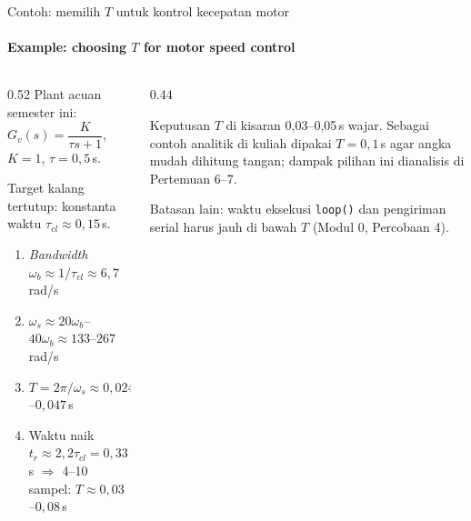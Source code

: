 \documentclass[aspectratio=169,10pt]{beamer}
\begin{document}
\begin{frame}{Contoh: memilih $T$ untuk kontrol kecepatan motor}
	\framesubtitle{Example: choosing $T$ for motor speed control}
	\begin{columns}[T]
		\begin{column}{0.52\textwidth}
			\small
			Plant acuan semester ini: $G_v(s) = \dfrac{K}{\tau s+1}$, $K=1$, $\tau = 0{,}5$\,s.

			\vspace{0.2cm}
			Target kalang tertutup: konstanta waktu $\tau_{cl} \approx 0{,}15$\,s.
			\begin{enumerate}
				\item \textit{Bandwidth} $\omega_b \approx 1/\tau_{cl} \approx 6{,}7$ rad/s
				\item $\omega_s \approx 20\omega_b$--$40\omega_b \approx 133$--$267$ rad/s
				\item $T = 2\pi/\omega_s \approx 0{,}024$--$0{,}047$\,s
				\item Waktu naik $t_r \approx 2{,}2\tau_{cl} = 0{,}33$\,s $\Rightarrow$ 4--10 sampel: $T \approx 0{,}03$--$0{,}08$\,s
			\end{enumerate}
		\end{column}
		\begin{column}{0.44\textwidth}
			\begin{block}{Keputusan}
				\small
				$T$ di kisaran 0,03--0,05\,s wajar. Sebagai contoh analitik di kuliah dipakai $T=0{,}1$\,s agar angka mudah dihitung tangan; dampak pilihan ini dianalisis di Pertemuan 6--7.
			\end{block}
			\vspace{0.1cm}
			{\small Batasan lain: waktu eksekusi \texttt{loop()} dan pengiriman serial harus jauh di bawah $T$ (Modul 0, Percobaan 4).}
		\end{column}
	\end{columns}
\end{frame}
\end{document}
